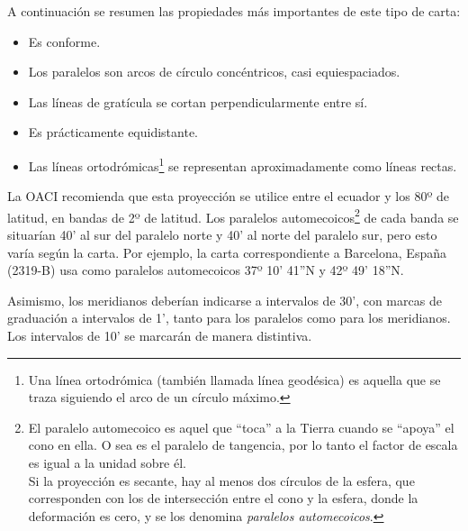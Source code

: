 A continuaci\'on se resumen las propiedades m\'as importantes de este tipo de carta:
\begin{itemize}

\item Es conforme.

  \item Los paralelos son arcos de c\'irculo conc\'entricos, casi
  equiespaciados.

  \item Las l\'ineas de grat\'icula se cortan perpendicularmente entre s\'i.

  \item Es pr\'acticamente equidistante.

  \item Las l\'ineas ortodr\'omicas\footnote{Una l\'inea ortodr\'omica (tambi\'en llamada l\'inea geod\'esica) es aquella que se traza siguiendo el arco de un c\'irculo m\'aximo.} se representan aproximadamente como l\'ineas
  rectas.
\end{itemize}
La OACI recomienda que esta proyecci\'on se utilice entre el ecuador y los 80º de latitud, en bandas de 2º de latitud. Los paralelos automecoicos\footnote{El paralelo automecoico es aquel que ``toca'' a la Tierra cuando se ``apoya'' el cono en ella. O sea es el paralelo de tangencia, por lo tanto el factor de escala es igual a la unidad sobre \'el.\\ Si la proyecci\'on es secante, hay al menos dos c\'irculos de la esfera, que corresponden con los de intersecci\'on entre el cono y la esfera, donde la deformaci\'on es cero, y se los denomina \emph{paralelos automecoicos}. } de cada banda se situar\'ian 40' al sur del paralelo norte y 40' al norte del paralelo sur, pero esto var\'ia seg\'un la carta. Por ejemplo, la carta correspondiente a Barcelona, Espa\~na (2319-B) usa como paralelos automecoicos 37º 10' 41''N y 42º 49' 18''N.


Asimismo, los meridianos deber\'ian indicarse a intervalos de 30', con marcas de graduaci\'on a intervalos de 1', tanto para los paralelos como para los meridianos. Los intervalos de 10' se marcar\'an de manera distintiva.

